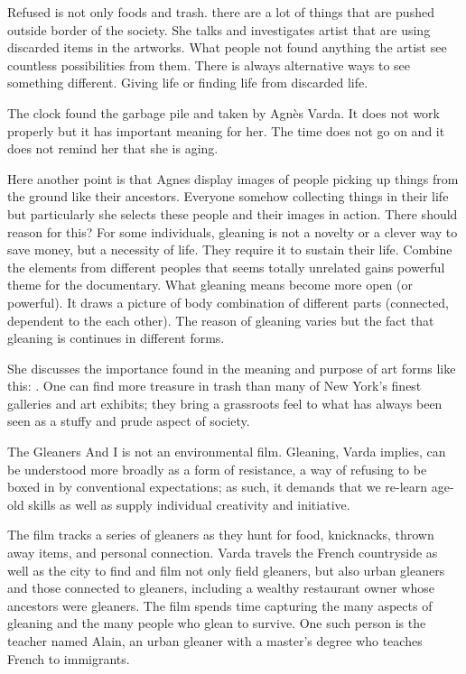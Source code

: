 Refused is not only foods and trash. there are a lot of things that are pushed outside border of the society. She talks and investigates artist that are using discarded items in the artworks. What people not found anything the artist see countless possibilities from them. There is always alternative ways to see something different. Giving life or finding life from discarded life.

The clock found the garbage pile and taken by Agnès Varda. It does not work properly but it has important meaning for her. The time does not go on and it does not remind her that she is aging.

Here another point is that Agnes display images of people picking up things from the ground like their ancestors. Everyone somehow collecting things in their life but particularly she selects these people and their images in action. There should reason for this? For some individuals, gleaning is not a novelty or a clever way to save money, but a necessity of life. They require it to sustain their life. Combine the elements from different peoples that seems totally unrelated gains powerful theme for the documentary. What gleaning means become more open (or powerful). It draws a picture of body combination of different parts (connected, dependent to the each other). The reason of gleaning varies but the fact that gleaning is continues in different forms.

She discusses the importance found in the meaning and purpose of art forms like this:  \cite{cruickshank2007work}. One can find more treasure in trash than many of New York’s finest galleries and art exhibits; they bring a grassroots feel to what has always been seen as a stuffy and prude aspect of society.

The Gleaners And I is not an environmental film. Gleaning, Varda implies, can be understood more broadly as a form of resistance, a way of refusing to be boxed in by conventional expectations; as such, it demands that we re-learn age-old skills as well as supply individual creativity and initiative.

The film tracks a series of gleaners as they hunt for food, knicknacks, thrown away items, and personal connection. Varda travels the French countryside as well as the city to find and film not only field gleaners, but also urban gleaners and those connected to gleaners, including a wealthy restaurant owner whose ancestors were gleaners. The film spends time capturing the many aspects of gleaning and the many people who glean to survive. One such person is the teacher named Alain, an urban gleaner with a master's degree who teaches French to immigrants.

